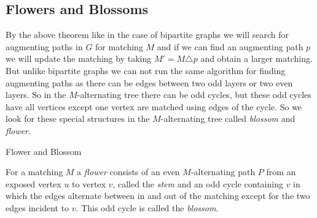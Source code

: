 \subsection{Flowers and Blossoms}
By the above theorem like in the case of bipartite graphs we will search for augmenting paths in $G$ for matching $M$ and if we can find an augmenting path $p$ we will update the matching by taking $M'=M\triangle p$ and obtain a larger matching. But unlike bipartite graphs we can not run the same algorithm for finding augmenting paths as there can be edges between two odd layers or two even layers. So in the $M$-alternating tree there can be odd cycles, but these odd cycles have all vertices except one vertex are matched using edges of the cycle. So we look for these special structures in the $M$-alternating tree called \emph{blossom} and \emph{flower}.
\begin{Definition}{Flower and Blossom}{}
	\begin{minipage}{0.65\textwidth}
		For a matching $M$ a \emph{flower} consists of an even $M$-alternating path $P$ from an exposed vertex $u$ to vertex $v$, called the \emph{stem} and an odd cycle containing $v$ in which the edges alternate between in and out of the matching except for the two edges incident to $v$. This odd cycle is called the \emph{blossom}.
	\end{minipage}\hspace{5pt}
	\begin{minipage}{0.25\textwidth}
		\usetikzlibrary{decorations.pathreplacing,arrows.meta, calc}
	\end{minipage}
\end{Definition}

